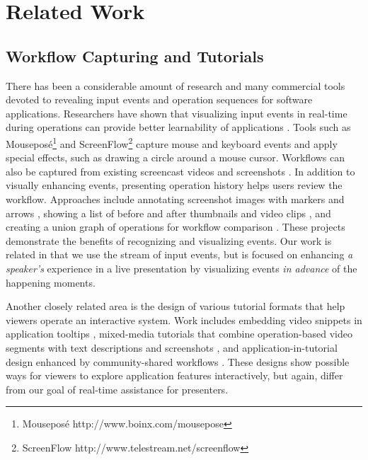 \section{Related Work}

\subsection{Workflow Capturing and Tutorials}
There has been a considerable amount of research and many commercial tools devoted to revealing input events and operation sequences for software applications. Researchers have shown that visualizing input events in real-time during operations can provide better learnability of applications \cite{Dixon:2010fb}. Tools such as Mouseposé\footnote{Mouseposé http://www.boinx.com/mousepose} and ScreenFlow\footnote{ScreenFlow http://www.telestream.net/screenflow} capture mouse and keyboard events and apply special effects, such as drawing a circle around a mouse cursor. Workflows can also be captured from existing screencast videos \cite{Banovic:2012kd} and screenshots \cite{Yeh:2009dh}. In addition to visually enhancing events, presenting operation history helps users review the workflow. Approaches include annotating screenshot images with markers and arrows \cite{Grabler:2009jj,Nakamura:2008:ASV:1449715.1449721}, showing a list of before and after thumbnails and video clips \cite{Grossman:2010jz}, and creating a union graph of operations for workflow comparison \cite{Kong:2012:DTR:2207676.2208549}. These projects demonstrate the benefits of recognizing and visualizing events. Our work is related in that we use the stream of input events, but is focused on enhancing \textit{a speaker's} experience in a live presentation by visualizing events \textit{in advance} of the happening moments.

Another closely related area is the design of various tutorial formats that help viewers operate an interactive system. Work includes embedding video snippets in application tooltips \cite{Grossman:2010wr}, mixed-media tutorials that combine operation-based video segments with text descriptions and screenshots \cite{Chi:2012:MAG:2380116.2380130}, and application-in-tutorial design enhanced by community-shared workflows \cite{Lafreniere:2013ff}. These designs show possible ways for viewers to explore application features interactively, but again, differ from our goal of real-time assistance for presenters.

